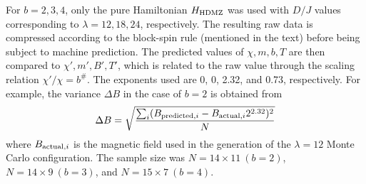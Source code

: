 \documentclass[reprint,amsmath,amssymb,aps,showpacs,superscriptaddress,prb]{revtex4-1}
\newcommand{\ba}{\begin{eqnarray}}
\newcommand{\ea}{\end{eqnarray}}
\begin{document}
For $b=2,3,4$, only the pure Hamiltonian $H_{\rm HDMZ}$ was used with $D/J$ values corresponding to $\lambda=12,18,24$, respectively. The resulting raw data is compressed according to the block-spin rule (mentioned in the text) before being subject to machine prediction. The predicted values of $\chi, m, b, T$ are then compared to $\chi', m', B', T'$, which is related to the raw value through the scaling relation $\chi'/\chi = b^\#$. The exponents used are 0, 0, 2.32, and 0.73, respectively. For example, the variance $\Delta B$ in the case of $b=2$ is obtained from
%
\ba \Delta B = \sqrt{ { \sum_i (B_{{\rm predicted}, i} - B_{{\rm actual}, i} 2^{2.32} )^2 \over N} } \ea
%
where $B_{{\rm actual}, i}$ is the magnetic field used in the generation of the $\lambda=12$ Monte Carlo configuration. The sample size was $N=14\times 11 ~ (b=2)$, $N=14\times 9 ~ (b=3)$, and $N=15\times 7 ~ (b=4)$.
\end{document}
